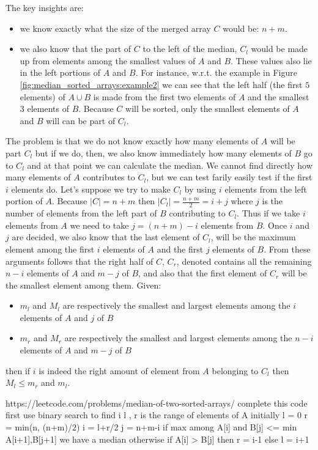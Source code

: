 The key insights are:
\begin{itemize}
	\item we know exactly what the size of the merged array $C$ would be: $n+m$.
	\item we also know that the part of $C$ to the left of the median, $C_l$ would be made up from elements among the smallest values of $A$
	and $B$. These values also lie in the left portions of $A$ and $B$. For instance, w.r.t. the example in Figure \ref{fig:median_sorted_arrays:example2} we
	can see that the left half (the first $5$ elements) of $A \cup B$ is made from the first two elements
	of $A$ and the smallest $3$ elements of $B$. Because $C$ will be sorted, only the smallest
	elements of $A$ and $B$ will can be part of $C_l$.
\end{itemize}
The problem is that we do not know exactly how many elements of $A$ will be part $C_l$ but if we do, then, we also know immediately how many elements of $B$ go to $C_l$
and at that point we can calculate the median.
We cannot find directly how many elements  of $A$ contributes to $C_l$, but we can test farily easily test if the first $i$ elements do.
Let's suppose we try to make $C_l$ by using $i$ elements from the left portion of $A$.
Because $|C|=n+m$ then $|C_l| = \frac{n+m}{2} = i+j$ where $j$ is the number of elements from the left part of $B$ contributing to $C_l$. 
Thus if we take $i$ elements from $A$ we need to take $j = (n+m)-i$ elements from $B$. 
Once $i$ and $j$ are decided, we also know that the last element of $C_l$, will be the maximum element among the first $i$ elements of $A$ and the first $j$ elements of $B$.
From these arguments follows that the right half of $C$, $C_r$, denoted  contains all the remaining $n-i$ elements of $A$ and $m-j$ of $B$, 
and also that the first element of $C_r$ will be the smallest element among them.
Given:
\begin{itemize}
	\item $m_l$ and $M_l$ are respectively the smallest and largest elements among the $i$ elements of $A$ and $j$ of $B$
	\item $m_r$ and $M_r$ are respectively the smallest and largest elements among the $n-i$ elements of $A$ and $m-j$ of $B$
\end{itemize} 
then if $i$ is indeed the right amount of element from $A$ belonging to $C_l$ then $M_l \leq m_r$ and $m_l$.





https://leetcode.com/problems/median-of-two-sorted-arrays/ complete this code first
use binary search to find i
l , r is the range of elements of A initially l = 0 r = min(n, (n+m)/2)
i = l+r/2
j = n+m-i
if max among A[i] and B[j] <= min A[i+1],B[j+1] we have a median
otherwise 
if A[i] > B[j] then r = i-1
else l = i+1
